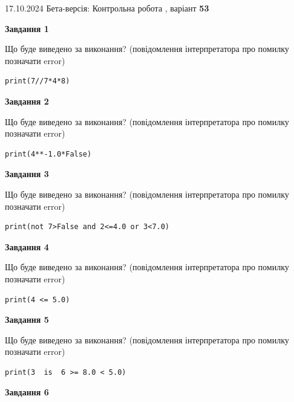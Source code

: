 \documentclass[12pt, ukrainian]{article}
\begin{document}
{\Large{17.10.2024 Бета-версія: Контрольна робота , варіант  \No \textbf { 53 }\par}}
{
\begin {large}
{\begin {center}\textbf{Завдання 1}\end {center}}

Що буде виведено за виконання? (повідомлення інтерпретатора про помилку позначати error)\par
\begin{verbatim}
print(7//7*4*8)
\end{verbatim}

{\begin {center}\textbf{Завдання 2}\end {center}}

Що буде виведено за виконання? (повідомлення інтерпретатора про помилку позначати error)\par
\begin{verbatim}
print(4**-1.0*False)
\end{verbatim}

{\begin {center}\textbf{Завдання 3}\end {center}}

Що буде виведено за виконання? (повідомлення інтерпретатора про помилку позначати error)\par
\begin{verbatim}
print(not 7>False and 2<=4.0 or 3<7.0)
\end{verbatim}

{\begin {center}\textbf{Завдання 4}\end {center}}

Що буде виведено за виконання? (повідомлення інтерпретатора про помилку позначати error)\par
\begin{verbatim}
print(4 <= 5.0)
\end{verbatim}

{\begin {center}\textbf{Завдання 5}\end {center}}

Що буде виведено за виконання? (повідомлення інтерпретатора про помилку позначати error)\par
\begin{verbatim}
print(3  is  6 >= 8.0 < 5.0)
\end{verbatim}

{\begin {center}\textbf{Завдання 6}\end {center}}


\end{large}}
\end{document}

